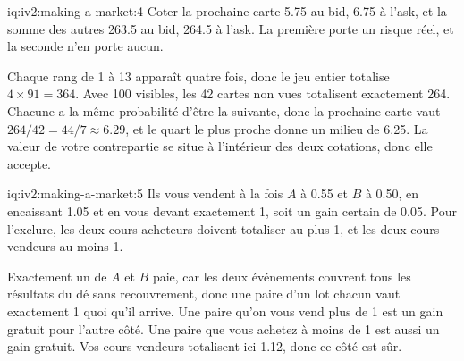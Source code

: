 \begin{solution}{iq:iv2:making-a-market:4}
Coter la prochaine carte 5.75 au bid, 6.75 à l'ask, et la somme des autres 263.5 au bid, 264.5 à l'ask. La première porte un risque réel, et la seconde n'en porte aucun.

Chaque rang de 1 à 13 apparaît quatre fois, donc le jeu entier totalise $4 \times 91 = 364$. Avec 100 visibles, les 42 cartes non vues totalisent exactement 264. Chacune a la même probabilité d'être la suivante, donc la prochaine carte vaut $264/42 = 44/7 \approx 6.29$, et le quart le plus proche donne un milieu de 6.25. La valeur de votre contrepartie se situe à l'intérieur des deux cotations, donc elle accepte.

\end{solution}

\begin{solution}{iq:iv2:making-a-market:5}
Ils vous vendent à la fois $A$ à 0.55 et $B$ à 0.50, en encaissant 1.05 et en vous devant exactement 1, soit un gain certain de 0.05. Pour l'exclure, les deux cours acheteurs doivent totaliser au plus 1, et les deux cours vendeurs au moins 1.

Exactement un de $A$ et $B$ paie, car les deux événements couvrent tous les résultats du dé sans recouvrement, donc une paire d'un lot chacun vaut exactement 1 quoi qu'il arrive. Une paire qu'on vous vend plus de 1 est un gain gratuit pour l'autre côté. Une paire que vous achetez à moins de 1 est aussi un gain gratuit. Vos cours vendeurs totalisent ici 1.12, donc ce côté est sûr.

\end{solution}

